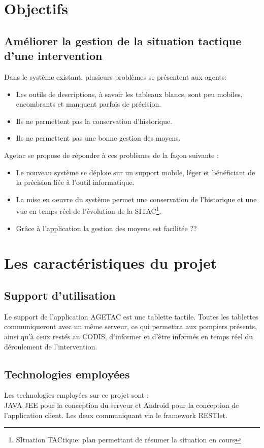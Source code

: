 \documentclass{article}
\begin{document}
\section{Objectifs}
\subsection*{Améliorer la gestion de la situation tactique d'une intervention}
Dans le système existant, plusieurs problèmes se présentent aux agents:
\begin{itemize}
\item Les outils de descriptions, à savoir les tableaux blancs, sont peu mobiles, encombrants et manquent parfois de précision.
\item Ils ne permettent pas la conservation d'historique.
\item Ils ne permettent pas une bonne gestion des moyens.
\end{itemize}
Agetac se propose de répondre à ces problèmes de la façon suivante :
\begin{itemize}
\item Le nouveau système se déploie sur un support mobile, léger et bénéficiant de la précision liée à l'outil informatique.
\item La mise en oeuvre du système permet une conservation de l'historique et une vue en temps réel de l'évolution de la SITAC\footnote{SItuation TACtique: plan permettant de résumer  la situation en cours}.
\item Grâce à l'application la gestion des moyens est facilitée ??
\end{itemize}
\section{Les caractéristiques du projet}
\subsection{Support d'utilisation}
Le support de l’application AGETAC est une tablette tactile. Toutes les tablettes communiqueront avec un même serveur, ce qui permettra aux pompiers présents, ainsi qu’à ceux restés au CODIS, d’informer et d’être informés en temps réel du déroulement de l’intervention. 
\subsection{Technologies employées}
Les technologies employées sur ce projet sont :\\
JAVA JEE pour la conception du serveur et Android pour la conception de l’application  client. Les deux communiquant via le framework RESTlet.
\end{document}
